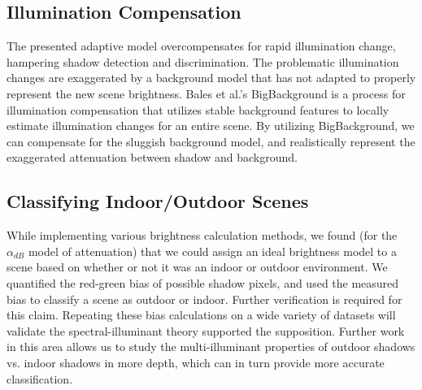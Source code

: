 \subsection{Illumination Compensation}

The presented adaptive model overcompensates for rapid illumination change, hampering shadow detection and discrimination. The problematic illumination changes are exaggerated by a background model that has not adapted to properly represent the new scene brightness. Bales et al.'s BigBackground is a process for illumination compensation that utilizes stable background features to locally estimate illumination changes for an entire scene. By utilizing BigBackground, we can compensate for the sluggish background model, and realistically represent the exaggerated attenuation between shadow and background.

\subsection{Classifying Indoor/Outdoor Scenes}

While implementing various brightness calculation methods, we found (for the $\alpha_{dB}$ model of attenuation) that we could assign an ideal brightness model to a scene based on whether or not it was an indoor or outdoor environment. We quantified the red-green bias of possible shadow pixels, and used the measured bias to classify a scene as outdoor or indoor. Further verification is required for this claim. Repeating these bias calculations on a wide variety of datasets will validate the spectral-illuminant theory supported the supposition. Further work in this area allows us to study the multi-illuminant properties of outdoor shadows vs. indoor shadows in more depth, which can in turn provide more accurate classification. 